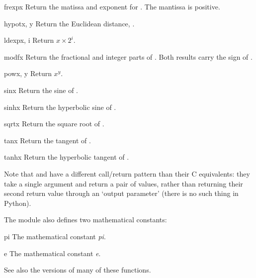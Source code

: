 \begin{funcdesc}{frexp}{x}
Return the matissa and exponent for .  The mantissa is
positive.
\end{funcdesc}

\begin{funcdesc}{hypot}{x, y}
Return the Euclidean distance, .
\end{funcdesc}

\begin{funcdesc}{ldexp}{x, i}
Return $x {\times} 2^i$.
\end{funcdesc}

\begin{funcdesc}{modf}{x}
Return the fractional and integer parts of .  Both results
carry the sign of .
\end{funcdesc}

\begin{funcdesc}{pow}{x, y}
Return $x^y$.
\end{funcdesc}

\begin{funcdesc}{sin}{x}
Return the sine of .
\end{funcdesc}

\begin{funcdesc}{sinh}{x}
Return the hyperbolic sine of .
\end{funcdesc}

\begin{funcdesc}{sqrt}{x}
Return the square root of .
\end{funcdesc}

\begin{funcdesc}{tan}{x}
Return the tangent of .
\end{funcdesc}

\begin{funcdesc}{tanh}{x}
Return the hyperbolic tangent of .
\end{funcdesc}

Note that  and  have a different call/return
pattern than their C equivalents: they take a single argument and
return a pair of values, rather than returning their second return
value through an `output parameter' (there is no such thing in Python).

The module also defines two mathematical constants:

\begin{datadesc}{pi}
The mathematical constant \emph{pi}.
\end{datadesc}

\begin{datadesc}{e}
The mathematical constant \emph{e}.
\end{datadesc}

See also the  versions of many of these functions.
